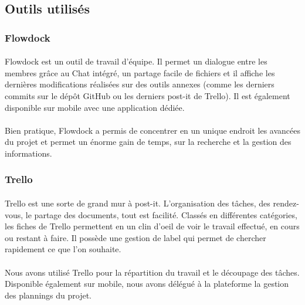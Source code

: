 \documentclass[12pt]{article}
\begin{document}
\newpage
 
\subsection{Outils utilisés}

\subsubsection{Flowdock}

\paragraph{}Flowdock est un outil de travail d'équipe. Il permet un dialogue entre les membres grâce au Chat intégré, un partage facile de fichiers et il affiche les dernières modifications réalisées sur des outils annexes (comme les derniers commits sur le dépôt GitHub ou les derniers post-it de Trello). Il est également disponible sur mobile avec une application dédiée.

\paragraph{}Bien pratique, Flowdock a permis de concentrer en un unique endroit les avancées du projet et permet un énorme gain de temps, sur la recherche et la gestion des informations.

\subsubsection{Trello}

\paragraph{}Trello est une sorte de grand mur à post-it. L'organisation des tâches, des rendez-vous, le partage des documents, tout est facilité. Classés en différentes catégories, les fiches de Trello permettent en un clin d'oeil de voir le travail effectué, en cours ou restant à faire. Il possède une gestion de label qui permet de chercher rapidement ce que l'on souhaite.

\paragraph{}Nous avons utilisé Trello pour la répartition du travail et le découpage des tâches. Disponible également sur mobile, nous avons délégué à la plateforme la gestion des plannings du projet.
\end{document}
